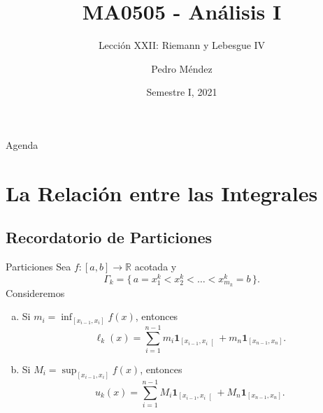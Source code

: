 \documentclass[utf8]{beamer}
\title[MA0505]{MA0505 - An\'alisis I}
\subtitle{Lecci\'on XXII: Riemann y Lebesgue IV}
\author{Pedro M\'endez\inst{1}}
\institute[Universidad de Costa Rica] %
{
  \inst{1}%
  Departmento de Matem\'atica Pura y Ciencias Actuariales\\
  Universidad de Costa Rica
  }
\date[I-2021] {Semestre I, 2021}
\theoremstyle{plain}
\theoremstyle{definition}
\theoremstyle{remark}
\numberwithin{equation}{section}
\newcommand{\Ga}{\Gamma}                %
\newcommand{\bR}{\mathbb{R}}    %
\newcommand{\bonj}[1]{\left\lbrack#1\right\rbrack}
\newcommand{\lbonj}[1]{\left\lbrack#1\right\lbrack}
\newcommand{\set}[1]{\{\,#1\,\}}    %
\renewcommand{\l}{\ell}                   %
\newcommand{\ind}{\mathbf{1}}       %
\renewcommand{\.}{\Cdot}                %
\begin{document}
\begin{frame}
  \titlepage
\end{frame}

\begin{frame}{Agenda}
  \tableofcontents
\end{frame}





\section{La Relación entre las Integrales}

\subsection{Recordatorio de Particiones}
\begin{frame}{Particiones}
Sea $f:[a,b]\to\bR$ acotada y 
$$\Ga_k=\set{a=x_1^k<x_2^k<\dots<x_{m_k}^k=b}.$$
Consideremos 
\begin{enumerate}[a)]
  \item Si $m_i=\inf_{\bonj{x_{i-1},x_i}}f(x)$, entonces 
  $$\l_k(x)=\sum_{i=1}^{n-1}m_i\ind_{\lbonj{x_{i-1},x_i}}+m_n\ind_{\bonj{x_{n-1},x_n}}.$$
  \item Si $M_i=\sup_{\bonj{x_{i-1},x_i}}f(x)$, entonces
  $$u_k(x)=\sum_{i=1}^{n-1}M_i\ind_{\lbonj{x_{i-1},x_i}}+M_n\ind_{\bonj{x_{n-1},x_n}}.$$
\end{enumerate}
\end{frame}
\end{document}
